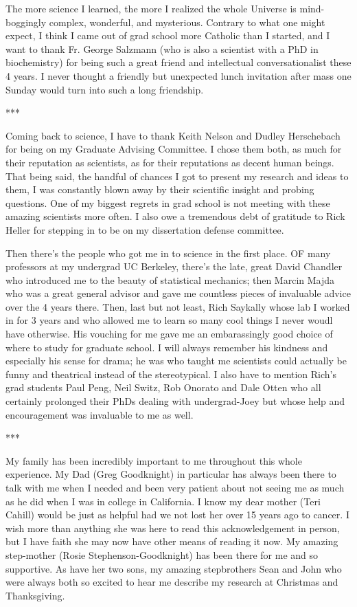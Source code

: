 The more science I learned, the more I realized the whole Universe is mind-boggingly complex, wonderful, and mysterious.  Contrary to what one might expect, I think I came out of grad school more Catholic than I started, and I want to thank Fr. George Salzmann (who is also a scientist with a PhD in biochemistry) for being such a great friend and intellectual conversationalist these 4 years.  I never thought a friendly but unexpected lunch invitation after mass one Sunday would turn into such a long friendship.

\begin{center}
   ***
\end{center}

Coming back to science, I have to thank Keith Nelson and Dudley Herschebach for being on my Graduate Advising Committee.  I chose them both, as much for their reputation as scientists, as for their reputations as decent human beings.  That being said, the handful of chances I got to present my research and ideas to them, I was constantly blown away by their scientific insight and probing questions.  One of my biggest regrets in grad school is not meeting with these amazing scientists more often.  I also owe a tremendous debt of gratitude to Rick Heller for stepping in to be on my dissertation defense committee.

Then there's the people who got me in to science in the first place.  OF many professors at my undergrad UC Berkeley, there's the late, great David Chandler who introduced me to the beauty of statistical mechanics; then Marcin Majda who was a great general advisor and gave me countless pieces of invaluable advice over the 4 years there.  Then, last but not least, Rich Saykally whose lab I worked in for 3 years and who allowed me to learn so many cool things I never woudl have otherwise.  His vouching for me gave me an embarassingly good choice of where to study for graduate school.  I will always remember his kindness and especially his sense for drama; he was who taught me scientists could actually be funny and theatrical instead of the stereotypical.  I also have to mention Rich's grad students Paul Peng, Neil Switz, Rob Onorato and Dale Otten who all certainly prolonged their PhDs dealing with undergrad-Joey but whose help and encouragement was invaluable to me as well.

\begin{center}
   ***
\end{center}

My family has been incredibly important to me throughout this whole experience.  My Dad (Greg Goodknight) in particular has always been there to talk with me when I needed and been very patient about not seeing me as much as he did when I was in college in California.  I know my dear mother (Teri Cahill) would be just as helpful had we not lost her over 15 years ago to cancer.  I wish more than anything she was here to read this acknowledgement in person, but I have faith she may now have other means of reading it now.  My amazing step-mother (Rosie Stephenson-Goodknight) has been there for me and so supportive.  As have her two sons, my amazing stepbrothers Sean and John who were always both so excited to hear me describe my research at Christmas and Thanksgiving.

